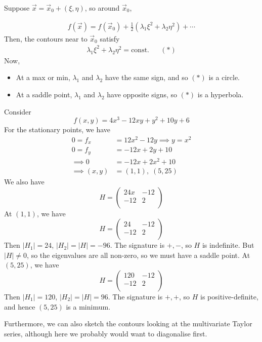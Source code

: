 \documentclass{../template/note}
\begin{document}
    Suppose \(\vec x = \vec x_0 + (\xi, \eta)\), so around \(\vec x_0\),

    \begin{align*}
        f(\vec x) = f(\vec x_0) + \frac{1}{2}(\lambda_1 \xi^2 + \lambda_2 \eta^2) + \cdots
    \end{align*}
    Then, the contours near to \(\vec x_0\) satisfy
    \begin{align*}
        \lambda_1 \xi^2 + \lambda_2 \eta^2 = \text{const.} && (*)
    \end{align*}
    Now,
    \begin{itemize}
        \item At a max or min, \(\lambda_1\) and \(\lambda_2\) have the same sign, and so \((*)\) is a circle.
        \item At a saddle point, \(\lambda_1\) and \(\lambda_2\) have opposite signs, so \((*)\) is a hyperbola.
    \end{itemize}
    
    \begin{example}
        Consider
        \[
            f(x, y) = 4x^3-12xy+y^2+10y+6
        \]
        For the stationary points, we have
        \begin{align*}
            0 = f_x &= 12x^2-12y \implies y = x^2\\
            0 = f_y &= -12x+2y+10 \\
            \implies 0 &= -12x + 2x^2 + 10 \\
            \implies (x, y) &= (1, 1), \; (5, 25)
        \end{align*}
        We also have
        \[
            H = \begin{pmatrix}
             24x & -12 \\
             -12 & 2 \\
            \end{pmatrix}
        \]
        At \((1, 1)\), we have
        \[
            H = \begin{pmatrix}
             24 & -12 \\
             -12 & 2 \\
            \end{pmatrix}
        \]
        Then \(|H_1| = 24\), \(|H_2| = |H| = -96\). The signature is \(+, -\), so \(H\) is indefinite. But \(|H| \neq 0\), so the eigenvalues are all non-zero, so we must have a saddle point. At \((5, 25)\), we have
        \[
            H = \begin{pmatrix}
             120 & -12 \\
             -12 & 2 \\
            \end{pmatrix}
        \]
        Then \(|H_1| = 120\), \(|H_2| = |H| = 96\). The signature is \(+, +\), so \(H\) is positive-definite, and hence \((5, 25)\) is a minimum.

        Furthermore, we can also sketch the contours looking at the multivariate Taylor series, although here we probably would want to diagonalise first.
        
    \end{example}
\end{document}
